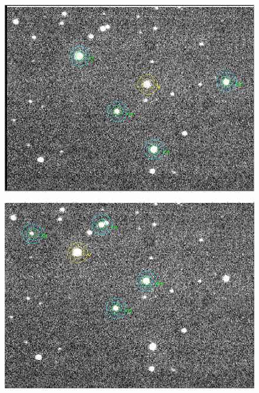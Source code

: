\documentclass[12pt]{article}
\begin{document}
\begin{figure}[H]
\centering
\begin{multicols}{2}
\begin{minipage}[H]{0.5\textwidth}
\includegraphics[scale=0.43]{Images/AsImages/MI/Sr1-Aperture.PNG} \\
\end{minipage}
\begin{minipage}[H]{0.5\textwidth}
\includegraphics[scale=0.43]{Images/AsImages/MI/Sr3-Aperture.PNG}
\end{minipage}
\begin{minipage}[H]{0.5\textwidth}

\end{minipage}
\end{multicols}
\end{figure}
\end{document}
